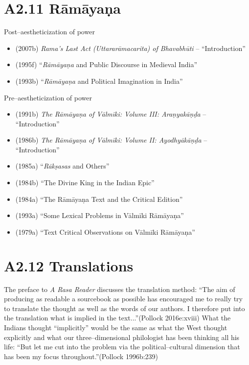 \section*{A2.11 Rāmāyaṇa}

Post–aestheticization of power

\begin{itemize}
\item (2007b) \textit{Rama's Last Act (Uttararāmacarita) of Bhavabhūti} – “Introduction”

 \item (1995f) “\textit{Rāmāyaṇa} and Public Discourse in Medieval India”

 \item (1993b) “\textit{Rāmāyaṇa} and Political Imagination in India”

\end{itemize}

Pre–aestheticization of power

\begin{itemize}
\item (1991b) \textit{The Rāmāyaṇa of Vālmīki: Volume III: Araṇyakāṇḍa} – “Introduction”

 \item (1986b) \textit{The Rāmāyaṇa of Vālmīki: Volume II: Ayodhyākāṇḍa} – “Introduction”

 \item (1985a) “\textit{Rākṣasas} and Others”

 \item (1984b) “The Divine King in the Indian Epic”

 \item (1984a) “The Rāmāyaṇa Text and the Critical Edition”

 \item (1993a) “Some Lexical Problems in Vālmīki Rāmāyaṇa”

 \item (1979a) “Text Critical Observations on Vālmīki Rāmāyaṇa”

\end{itemize}


\section*{A2.12 Translations}

The preface to \textit{A Rasa Reader} discusses the translation method: “The aim of producing as readable a sourcebook as possible has encouraged me to really try to translate the thought as well as the words of our authors. I therefore put into the translation what is implied in the text...”(Pollock 2016e:xviii) What the Indians thought “implicitly” would be the same as what the West thought explicitly and what our three–dimensional philologist has been thinking all his life: “But let me cut into the problem via the political–cultural dimension that has been my focus throughout.”(Pollock 1996b:239)


